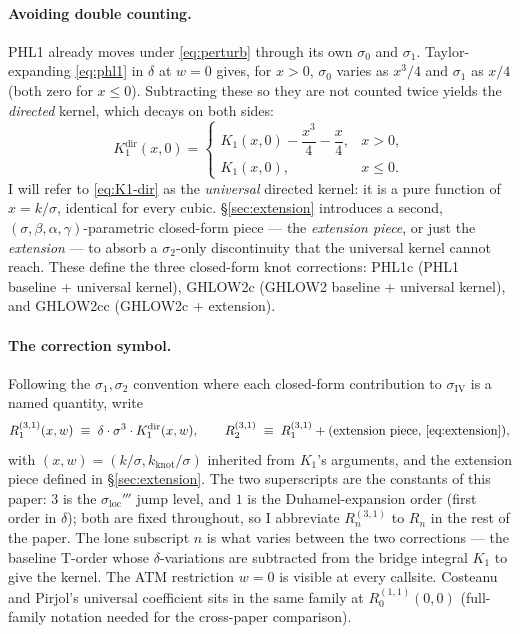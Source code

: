 \documentclass[11pt]{article}
\newcommand{\siv}{\sigma_{\mathrm{IV}}}
\begin{document}
\paragraph{Avoiding double counting.} PHL1 already moves under
\eqref{eq:perturb} through its own $\sigma_0$ and $\sigma_1$. Taylor-expanding
\eqref{eq:phl1} in $\delta$ at $w=0$ gives, for $x>0$,
$\sigma_0$ varies as $x^3/4$ and $\sigma_1$ as $x/4$ (both zero for $x\le0$).
Subtracting these so they are not counted twice yields the \emph{directed}
kernel, which decays on both sides:
\begin{equation}
K_1^{\mathrm{dir}}(x,0)=
\begin{cases}
K_1(x,0)-\dfrac{x^3}{4}-\dfrac{x}{4}, & x>0,\\[2ex]
K_1(x,0), & x\le 0.
\end{cases}
\label{eq:K1-dir}
\end{equation}
I will refer to \eqref{eq:K1-dir} as the \emph{universal} directed
kernel: it is a pure function of $x=k/\sigma$, identical for every
cubic. \S\ref{sec:extension} introduces a second,
$(\sigma,\beta,\alpha,\gamma)$-parametric closed-form piece --- the
\emph{extension piece}, or just the \emph{extension} --- to absorb a
$\sigma_2$-only discontinuity that the universal kernel cannot reach.
These define the three closed-form knot corrections: PHL1c (PHL1
baseline + universal kernel), GHLOW2c (GHLOW2 baseline + universal
kernel), and GHLOW2cc (GHLOW2c + extension).
\paragraph{The correction symbol.} Following the $\sigma_1, \sigma_2$
convention where each closed-form contribution to $\siv$ is a named
quantity, write
\begin{equation}
R^{(3, 1)}_{1}(x, w) \;\equiv\; \delta\cdot\sigma^{3}\cdot K_1^{\mathrm{dir}}(x, w),
\qquad
R^{(3, 1)}_{2} \;\equiv\; R^{(3, 1)}_{1} + (\text{extension piece, }\eqref{eq:extension}),
\label{eq:R-def}
\end{equation}
with $(x, w) = (k/\sigma, k_{\mathrm{knot}}/\sigma)$ inherited from
$K_1$'s arguments, and the extension piece defined in
\S\ref{sec:extension}. The two
superscripts are the constants of this paper: $3$ is the
$\sigma_{\mathrm{loc}}'''$ jump level, and $1$ is the Duhamel-expansion
order (first order in $\delta$); both are fixed throughout, so I
abbreviate $R^{(3, 1)}_{n}$ to $R_{n}$ in the rest of the paper. The
lone subscript $n$ is what varies between the two corrections --- the
baseline T-order whose $\delta$-variations are subtracted from the
bridge integral $K_1$ to give the kernel. The ATM restriction $w=0$
is visible at every callsite. Costeanu and Pirjol's universal
coefficient \citep{costeanuPirjol2011} sits in the same family at
$R^{(1, 1)}_{0}(0, 0)$ (full-family notation needed for the
cross-paper comparison).
\end{document}
